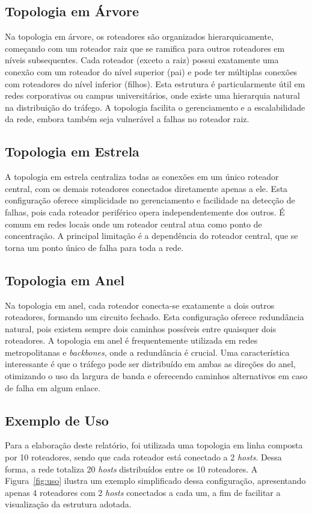 \documentclass[12pt,a4paper]{report}
\begin{document}
\subsection{Topologia em Árvore}

Na topologia em árvore, os roteadores são organizados hierarquicamente, começando com um roteador raiz que se ramifica para outros roteadores em níveis subsequentes. Cada roteador (exceto a raiz) possui exatamente uma conexão com um roteador do nível superior (pai) e pode ter múltiplas conexões com roteadores do nível inferior (filhos). Esta estrutura é particularmente útil em redes corporativas ou campus universitários, onde existe uma hierarquia natural na distribuição do tráfego. A topologia facilita o gerenciamento e a escalabilidade da rede, embora também seja vulnerável a falhas no roteador raiz.

\subsection{Topologia em Estrela}

A topologia em estrela centraliza todas as conexões em um único roteador central, com os demais roteadores conectados diretamente apenas a ele. Esta configuração oferece simplicidade no gerenciamento e facilidade na detecção de falhas, pois cada roteador periférico opera independentemente dos outros. É comum em redes locais onde um roteador central atua como ponto de concentração. A principal limitação é a dependência do roteador central, que se torna um ponto único de falha para toda a rede.

\subsection{Topologia em Anel}

Na topologia em anel, cada roteador conecta-se exatamente a dois outros roteadores, formando um circuito fechado. Esta configuração oferece redundância natural, pois existem sempre dois caminhos possíveis entre quaisquer dois roteadores. A topologia em anel é frequentemente utilizada em redes metropolitanas e \textit{backbones}, onde a redundância é crucial. Uma característica interessante é que o tráfego pode ser distribuído em ambas as direções do anel, otimizando o uso da largura de banda e oferecendo caminhos alternativos em caso de falha em algum enlace.

\subsection{Exemplo de Uso}
Para a elaboração deste relatório, foi utilizada uma topologia em linha composta por 10 roteadores, sendo que cada roteador está conectado a 2 \textit{hosts}. Dessa forma, a rede totaliza 20 \textit{hosts} distribuídos entre os 10 roteadores. A Figura~\ref{fig:uso} ilustra um exemplo simplificado dessa configuração, apresentando apenas 4 roteadores com 2 \textit{hosts} conectados a cada um, a fim de facilitar a visualização da estrutura adotada.
\end{document}

